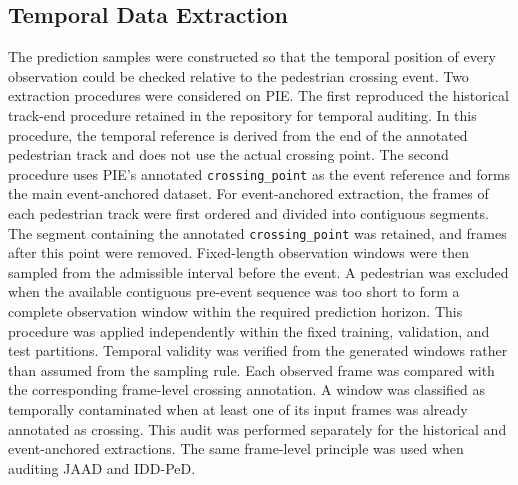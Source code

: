 \documentclass[mti,article,submit,moreauthors]{Definitions/mdpi}
\begin{document}
\subsection{Temporal Data Extraction}

The prediction samples were constructed so that the temporal position of every observation could be checked relative to the pedestrian crossing event. Two extraction procedures were considered on PIE. The first reproduced the historical track-end procedure retained in the repository for temporal auditing. In this procedure, the temporal reference is derived from the end of the annotated pedestrian track and does not use the actual crossing point. The second procedure uses PIE's annotated \texttt{crossing\_point} as the event reference and
forms the main event-anchored dataset. For event-anchored extraction, the frames of each pedestrian track were first ordered and divided into contiguous segments. The segment containing the annotated \texttt{crossing\_point} was retained, and frames after this point were removed. Fixed-length observation windows were then sampled from the admissible interval before the event. A pedestrian was excluded when the available contiguous pre-event sequence was too short to form a complete observation window within the required prediction horizon. This procedure was applied independently within the fixed training, validation, and test partitions. Temporal validity was verified from the generated windows rather than assumed from the sampling rule. Each observed frame was compared with the corresponding frame-level crossing annotation. A window was classified as temporally contaminated when at least one of its input frames was already annotated as crossing. This audit was performed separately for the historical and event-anchored extractions. The same frame-level principle was used when auditing JAAD and IDD-PeD.
\end{document}
